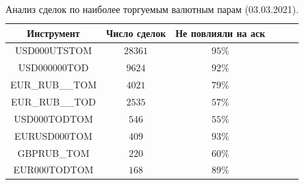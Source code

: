 
\begin{table}[h!]
    \begin{center}
        \begin{tabular}{|c|c|c|c|c|c|}
            \hline
        Инструмент        & Число сделок & Не повлияли на аск  %
        \\ \hline
        USD000UTSTOM    & $28361$ &    $95\%$ %
        \\ \hline
        USD000000TOD    & $9624$ &     $92\%$ %
        \\ \hline
        EUR\_RUB\_\_TOM & $4021$ &  $79\%$ %
        \\ \hline
        EUR\_RUB\_\_TOD & $2535$ &  $57\%$ %
        \\ \hline
        USD000TODTOM    & $546$ &      $55\%$ %
        \\ \hline
        EURUSD000TOM    & $409$ &      $93\%$ %
        \\ \hline
        GBPRUB\_TOM     & $220$ &       $60\%$ %
        \\ \hline
        EUR000TODTOM    & $168$ &      $89\%$ %
          \\ \hline
        \end{tabular}
    \end{center}
    \label{tableanalCUnew}
    \caption{Анализ сделок по наиболее торгуемым валютным парам (03.03.2021).}
\end{table} 

